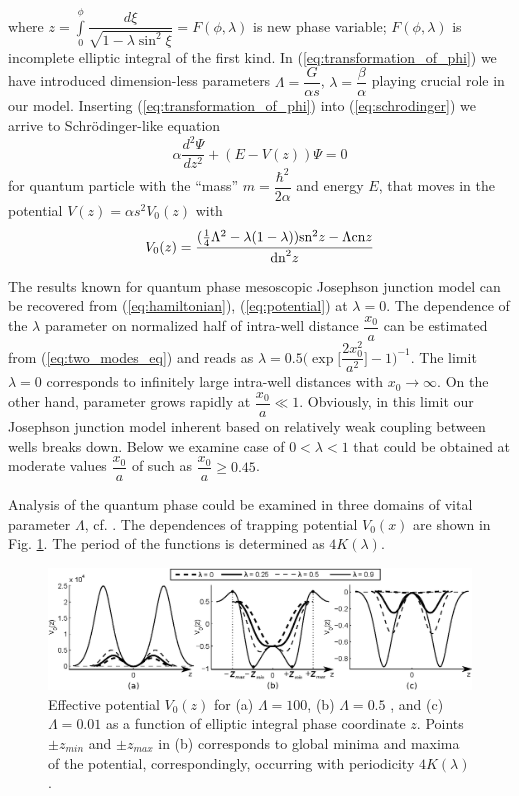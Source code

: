 \documentclass[aps, pre, preprint, groupedaddress, superscriptaddress, showkeys, showpacs] {revtex4-1}
\begin{document}
%
where $z = \int \limits_0^\phi \dfrac{d \xi}{\sqrt{1 - \lambda \sin^2 \xi}} = F(\phi, \lambda)$ is new phase variable; $F(\phi, \lambda)$ is incomplete elliptic integral of the first kind.
In (\ref{eq:transformation_of_phi}) we have introduced dimension-less parameters $\Lambda = \dfrac{G}{\alpha s}$, $\lambda = \dfrac{\beta}{\alpha}$ playing crucial role in our model.
Inserting (\ref{eq:transformation_of_phi}) into (\ref{eq:schrodinger}) we arrive to Schr\"odinger-like equation
% 
\begin{equation}
\alpha \frac{d^2\Psi}{dz^2} + (E - V(z))\Psi = 0
\label{eq:schrodinger_usual}
\end{equation}
%
for quantum particle with the ``mass''  $m = \dfrac{\hbar^2}{2 \alpha}$ and energy $E$, that moves in the potential $V(z) = \alpha s^2 V_0(z)$ with
%
\begin{equation}
V_0(z) = \frac{ (\frac{1}{4} \Lambda^2 - \lambda (1 - \lambda)) \textrm{sn}^2{z} - \Lambda \textrm{cn}{z}}{\textrm{dn}^2{z}}
\label{eq:potential}
\end{equation}
%

The results known for quantum phase mesoscopic Josephson junction model can be recovered from (\ref{eq:hamiltonian}), (\ref{eq:potential}) at $\lambda = 0$.
The dependence of the $\lambda$ parameter on normalized half of intra-well distance $\dfrac{x_0}{a}$ can be estimated from (\ref{eq:two_modes_eq}) and reads as $\lambda = 0.5 \Big( \exp \Big[ \dfrac{2 x_0^2}{a^2} \Big] - 1 \Big)^{-1}$.
The limit $\lambda = 0$ corresponds to  infinitely large intra-well distances with $x_0 \to \infty$.
On the other hand, parameter grows rapidly at $\dfrac{x_0}{a} \ll 1$.
Obviously, in this limit our Josephson junction model inherent based on relatively weak coupling between wells breaks down.
Below we examine case of $0 < \lambda < 1$ that could be obtained at moderate values $\dfrac{x_0}{a}$ of such as $\dfrac{x_0}{a} \geq 0.45$. 

Analysis of the quantum phase could be examined in three domains of vital parameter $\Lambda$, cf. \cite{Anglin}.
The dependences of trapping potential $V_0(x)$ are shown in Fig. \ref{phase_potential}.
The period of the functions is determined as $4K(\lambda)$.
%
\begin{figure}[ht]
\begin{center}\includegraphics[width=1\linewidth]{pic/potentials.eps}
\end{center}
\caption{
Effective potential $V_0(z)$ for (a) $\Lambda = 100$, (b) $\Lambda = 0.5$ , and (c) $\Lambda = 0.01$ as a function of  elliptic integral phase coordinate $z$.
Points $\pm z_{min}$ and $\pm z_{max}$ in (b) corresponds to global minima and maxima of the potential, correspondingly, occurring with periodicity $4K(\lambda)$. \label{phase_potential}}
\end{figure}
%
\end{document}
